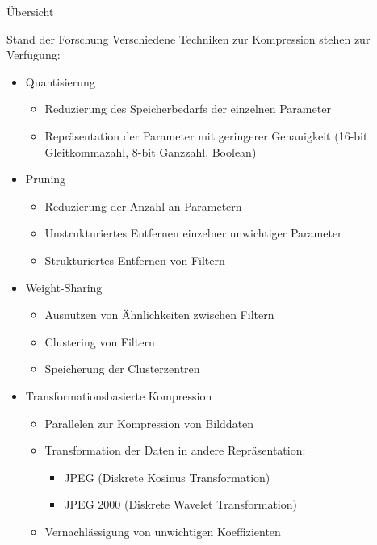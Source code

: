 \documentclass[aspectratio=169, 12pt]{beamer}
\begin{document}
\begin{frame}{Übersicht}
  \tableofcontents[currentsection]
\end{frame}

\begin{frame}{Stand der Forschung}
  Verschiedene Techniken zur Kompression stehen zur Verfügung:

  \begin{itemize}
    \item Quantisierung
          \begin{itemize}
            \item Reduzierung des Speicherbedarfs der einzelnen Parameter
            \item Repräsentation der Parameter mit geringerer Genauigkeit (16-bit Gleitkommazahl, 8-bit Ganzzahl, Boolean)
          \end{itemize}
    \item Pruning
          \begin{itemize}
            \item Reduzierung der Anzahl an Parametern
            \item Unstrukturiertes Entfernen einzelner unwichtiger Parameter
            \item Strukturiertes Entfernen von Filtern
          \end{itemize}
  \end{itemize}
\end{frame}

\begin{frame}
  \begin{itemize}
    \item Weight-Sharing
          \begin{itemize}
            \item Ausnutzen von Ähnlichkeiten zwischen Filtern
            \item Clustering von Filtern
            \item Speicherung der Clusterzentren
          \end{itemize}
    \item Transformationsbasierte Kompression
          \begin{itemize}
            \item Parallelen zur Kompression von Bilddaten
            \item Transformation der Daten in andere Repräsentation:
                  \begin{itemize}
                    \item JPEG (Diskrete Kosinus Transformation)
                    \item JPEG 2000 (Diskrete Wavelet Transformation)
                  \end{itemize}
            \item Vernachlässigung von unwichtigen Koeffizienten
          \end{itemize}
  \end{itemize}
\end{frame}
\end{document}
